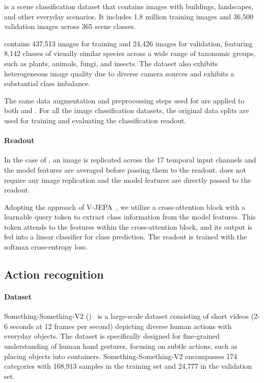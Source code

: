 \Tplaces is a scene classification dataset that contains images with buildings, landscapes, and other everyday scenarios. It includes 1.8 million training images and 36,500 validation images across 365 scene classes. 

\Tinat contains 437{,}513 images for training and 24{,}426 images for validation, featuring 8,142 classes of visually similar species across a wide range of taxonomic groups, such as plants, animals, fungi, and insects. The dataset also exhibits heterogeneous image quality due to diverse camera sources and exhibits a substantial class imbalance.

The same data augmentation and preprocessing steps used for \Timagenet are applied to both \Tinat and \Tplaces. For all the image classification datasets, the original data splits are used for training and evaluating the classification readout.




\paragraph{Readout}
In the case of \vwalt, an image is replicated across the 17 temporal input channels and the model features are averaged before passing them to the readout. \iwalt does not require any image replication and the model features are directly passed to the readout.

Adopting the approach of V-JEPA~\cite{vjepa}, we utilize a cross-attention block with a learnable query token to extract class information from the model features. This token attends to the features within the cross-attention block, and its output is fed into a linear classifier for class prediction. The readout is trained with the softmax cross-entropy  loss.

\subsection{Action recognition}

\paragraph{Dataset}
Something-Something-V2 (\Tssv)~\cite{ssv2} is a large-scale dataset consisting of short videos (2-6 seconds at 12 frames per second) depicting diverse human actions with everyday objects.  The dataset is specifically designed for fine-grained understanding of human hand gestures, focusing on subtle actions, such as placing objects into containers. Something-Something-V2 encompasses 174 categories with 168,913 samples in the training set and 24,777 in the validation set.

